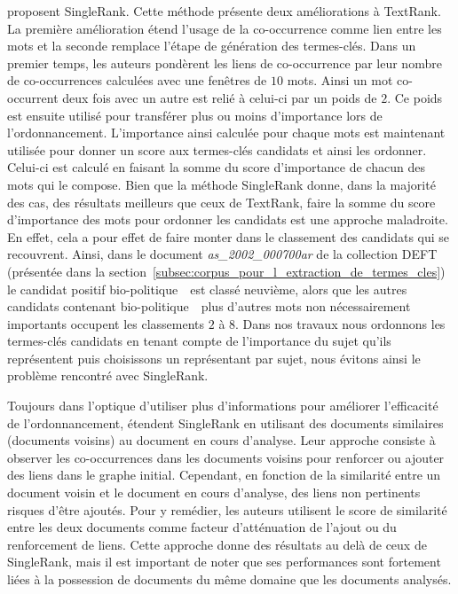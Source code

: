      proposent SingleRank. Cette méthode présente
    deux améliorations à TextRank. La première amélioration étend l'usage de la
    co-occurrence comme lien entre les mots et la seconde remplace l'étape de
    génération des termes-clés. Dans un premier temps, les auteurs pondèrent les
    liens de co-occurrence par leur nombre de co-occurrences calculées avec une
    fenêtres de $10$ mots. Ainsi un mot co-occurrent deux fois avec un autre est
    relié à celui-ci par un poids de $2$. Ce poids est ensuite utilisé pour
    transférer plus ou moins d'importance lors de l'ordonnancement.
    L'importance ainsi calculée pour chaque mots est maintenant utilisée
    pour donner un score aux termes-clés candidats et ainsi les ordonner.
    Celui-ci est calculé en faisant la somme du score d'importance de chacun des
    mots qui le compose. Bien que la méthode SingleRank donne, dans la majorité
    des cas, des résultats meilleurs que ceux de TextRank, faire la somme du
    score d'importance des mots pour ordonner les candidats est une approche
    maladroite. En effet, cela a pour effet de faire monter dans le classement
    des candidats qui se recouvrent. Ainsi, dans le document
    \textit{as\_2002\_000700ar} de la collection DEFT (présentée dans la
    section~\ref{subsec:corpus_pour_l_extraction_de_termes_cles}) le candidat
    positif \og bio-politique~\fg\ est classé neuvième, alors que les autres
    candidats contenant \og bio-politique~\fg\ plus d'autres mots non
    nécessairement importants occupent les classements $2$ à $8$. Dans nos
    travaux nous ordonnons les termes-clés candidats en tenant compte de
    l'importance du sujet qu'ils représentent puis choisissons un représentant
    par sujet, nous évitons ainsi le problème rencontré avec SingleRank.

    Toujours dans l'optique d'utiliser plus d'informations pour améliorer
    l'efficacité de l'ordonnancement,  étendent
    SingleRank en utilisant des documents similaires (documents voisins) au
    document en cours d'analyse. Leur approche consiste à observer les
    co-occurrences dans les documents voisins pour renforcer ou ajouter des
    liens dans le graphe initial. Cependant, en fonction de la similarité entre
    un document voisin et le document en cours d'analyse, des liens non
    pertinents risques d'être ajoutés. Pour y remédier, les auteurs utilisent le
    score de similarité entre les deux documents comme facteur d'atténuation de
    l'ajout ou du renforcement de liens. Cette approche donne des résultats au
    delà de ceux de SingleRank, mais il est important de noter que ses
    performances sont fortement liées à la possession de documents du même
    domaine que les documents analysés.

